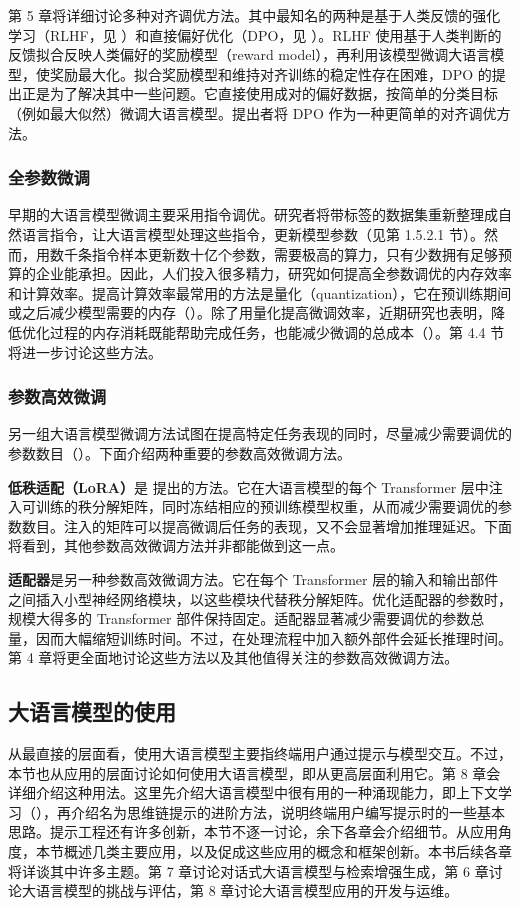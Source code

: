 第 5 章将详细讨论多种对齐调优方法。其中最知名的两种是基于人类反馈的强化学习（RLHF，见 ）和直接偏好优化（DPO，见 ）。RLHF 使用基于人类判断的反馈拟合反映人类偏好的奖励模型（reward model），再利用该模型微调大语言模型，使奖励最大化。拟合奖励模型和维持对齐训练的稳定性存在困难，DPO 的提出正是为了解决其中一些问题。它直接使用成对的偏好数据，按简单的分类目标（例如最大似然）微调大语言模型。提出者将 DPO 作为一种更简单的对齐调优方法。

\subsubsection{全参数微调}
早期的大语言模型微调主要采用指令调优。研究者将带标签的数据集重新整理成自然语言指令，让大语言模型处理这些指令，更新模型参数（见第 1.5.2.1 节）。然而，用数千条指令样本更新数十亿个参数，需要极高的算力，只有少数拥有足够预算的企业能承担。因此，人们投入很多精力，研究如何提高全参数调优的内存效率和计算效率。提高计算效率最常用的方法是量化（quantization），它在预训练期间或之后减少模型需要的内存（）。除了用量化提高微调效率，近期研究也表明，降低优化过程的内存消耗既能帮助完成任务，也能减少微调的总成本（）。第 4.4 节将进一步讨论这些方法。

\subsubsection{参数高效微调}
另一组大语言模型微调方法试图在提高特定任务表现的同时，尽量减少需要调优的参数数目（）。下面介绍两种重要的参数高效微调方法。

\textbf{低秩适配（LoRA）}是 提出的方法。它在大语言模型的每个 Transformer 层中注入可训练的秩分解矩阵，同时冻结相应的预训练模型权重，从而减少需要调优的参数数目。注入的矩阵可以提高微调后任务的表现，又不会显著增加推理延迟。下面将看到，其他参数高效微调方法并非都能做到这一点。

\textbf{适配器}是另一种参数高效微调方法。它在每个 Transformer 层的输入和输出部件之间插入小型神经网络模块，以这些模块代替秩分解矩阵。优化适配器的参数时，规模大得多的 Transformer 部件保持固定。适配器显著减少需要调优的参数总量，因而大幅缩短训练时间。不过，在处理流程中加入额外部件会延长推理时间。第 4 章将更全面地讨论这些方法以及其他值得关注的参数高效微调方法。

\subsection{大语言模型的使用}
从最直接的层面看，使用大语言模型主要指终端用户通过提示与模型交互。不过，本节也从应用的层面讨论如何使用大语言模型，即从更高层面利用它。第 8 章会详细介绍这种用法。这里先介绍大语言模型中很有用的一种涌现能力，即上下文学习（），再介绍名为思维链提示的进阶方法，说明终端用户编写提示时的一些基本思路。提示工程还有许多创新，本节不逐一讨论，余下各章会介绍细节。从应用角度，本节概述几类主要应用，以及促成这些应用的概念和框架创新。本书后续各章将详谈其中许多主题。第 7 章讨论对话式大语言模型与检索增强生成，第 6 章讨论大语言模型的挑战与评估，第 8 章讨论大语言模型应用的开发与运维。

